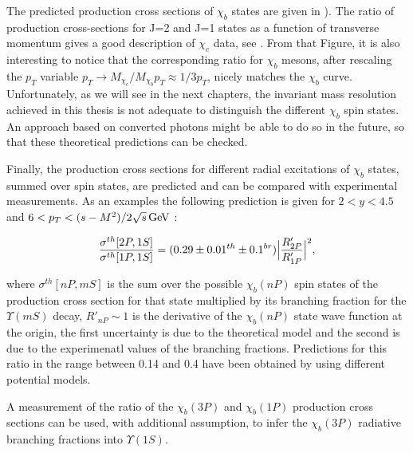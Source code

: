 The predicted production cross sections of $\chi_b$ states are
given in ). The ratio of production cross-sections for 
J=2 and J=1 states as a function of transverse
momentum gives a good description of $\chi_c$ data, see . From that Figure, 
it is also interesting to notice that the corresponding ratio for $\chi_b$ mesons, after rescaling the 
$p_T$ variable $p_T \rightarrow M_{\chi_c} / M_{\chi_b} p_T \approx 1/3 p_T$, nicely matches 
the $\chi_b$ curve. Unfortunately, as we will see in the next chapters, the invariant mass resolution achieved 
in this thesis is not adequate to distinguish the different $\chi_b$ spin states. An approach based on 
converted photons might be able to do so in the future, so that these theoretical predictions can be checked. 

Finally, the production cross sections for different radial excitations of $\chi_b$ states, summed over spin states, 
are predicted and can be compared with experimental measurements. As an examples the 
following prediction is given for $2 < y  < 4.5$ and $6 < p_T < (s-M^2)/2\sqrt{s} \mathrm{\,Ge\kern -0.1em V}$ :

\begin{equation}
\frac{\sigma^{th}[2P,1S]}{\sigma^{th}[1P,1S]} = (0.29 \pm 0.01^{th} \pm 0.1^{br}) \Bigl| \frac{R'_{2P}}{R'_{1P}}\Bigr|^2, 
\end{equation}

\noindent where $\sigma^{th}[nP,mS]$ is the sum over the possible $\chi_b(nP)$ spin states of the production cross 
section for that state multiplied by its branching fraction for the $\Upsilon(mS)$ decay, $R'_{nP} \sim 1$ is the derivative 
of the $\chi_b(nP)$ state wave function at the origin, the first uncertainty is due to the theoretical model and the second 
is due to the experimenatl values of the branching fractions.  Predictions for this ratio in the range between 0.14 and 0.4 
have been obtained by using different potential models. 

A measurement of the ratio of the $\chi_b(3P)$ and $\chi_b(1P)$ production cross sections can be used, with additional assumption, 
to infer the $\chi_b(3P)$ radiative branching fractions into $\Upsilon(1S)$. 

